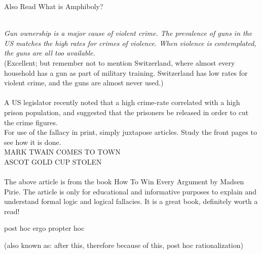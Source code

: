 \documentclass[a4paper,12pt,single,pdftex]{scrartcl}
\begin{document}
{    
      

      
        Also Read  What is Amphiboly?
      
    
    
       
    \\

    
      {\em Gun ownership is a major cause of violent crime. The prevalence of guns in the US matches the high rates for crimes of violence. When violence is contemplated, the guns are all too available.}
    \\

    
      (Excellent; but remember not to mention Switzerland, where almost every household has a gun as part of military training. Switzerland has low rates for violent crime, and the guns are almost never used.)
    \\

    
       
    \\

    
      A US legislator recently noted that a high crime-rate correlated with a high prison population, and suggested that the prisoners be released in order to cut the crime figures.
    \\

    
      For use of the fallacy in print, simply juxtapose articles. Study the front pages to see how it is done.
    \\

    
      MARK TWAIN COMES TO TOWN
    \\

    
      ASCOT GOLD CUP STOLEN
    \\

    
       
    \\

    
      The above article is from the book How To Win Every Argument by Madsen Pirie. The article is only for educational and informative purposes to explain and understand formal logic and logical fallacies. It is a great book, definitely worth a read!
    \\

  }


post hoc ergo propter hoc
    
      (also known as: after this, therefore because of this, post hoc rationalization)
    \\

  
    
\end{document}
